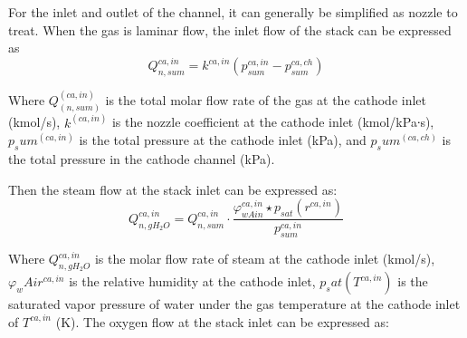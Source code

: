 For the inlet and outlet of the channel, it can generally be simplified as nozzle to treat. When the gas is laminar flow, the inlet flow of the stack can be expressed as
\begin{equation}
    Q_{n,s u m}^{c a,i n}=k^{c a,i n}(p_{s u m}^{c a,i n}-p_{s u m}^{c a,c h})
\end{equation}

Where $Q_(n,sum)^(ca,in)$ is the total molar flow rate of the gas at the cathode inlet (kmol/s), $k^(ca,in)$ is the nozzle coefficient at the cathode inlet (kmol/kPa∙s), $p_sum^(ca,in)$ is the total pressure at the cathode inlet (kPa), and $p_sum^(ca,ch)$ is the total pressure in the cathode channel (kPa).
\par
Then the steam flow at the stack inlet can be expressed as:
\begin{equation}
    Q_{n,g H_{2}O}^{c a,i n}=Q_{n,s u m}^{c a,i n}\cdot\frac{\varphi_{w A i n}^{c a,i n} \star p_{s a t}(r^{c a,i n})}{p_{s u m}^{c a,i n}}
\end{equation}

Where $Q_{n,gH_2 O}^{ca,in}$  is the molar flow rate of steam at the cathode inlet (kmol/s), $\varphi_wAir^{ca,in}$ is the relative humidity at the cathode inlet, $p_sat (T^{ca,in})$ is the saturated vapor pressure of water under the gas temperature at the cathode inlet of $T^{ca,in}$ (K). 
The oxygen flow at the stack inlet can be expressed as:
